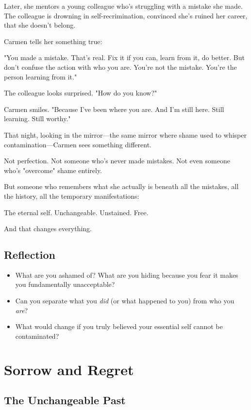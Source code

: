 \documentclass[11pt,twoside]{book}
\begin{document}
Later, she mentors a young colleague who's struggling with a mistake she made. The colleague is drowning in self-recrimination, convinced she's ruined her career, that she doesn't belong.

Carmen tells her something true:

"You made a mistake. That's real. Fix it if you can, learn from it, do better. But don't confuse the action with who you are. You're not the mistake. You're the person learning from it."

The colleague looks surprised. "How do you know?"

Carmen smiles. "Because I've been where you are. And I'm still here. Still learning. Still worthy."

That night, looking in the mirror—the same mirror where shame used to whisper contamination—Carmen sees something different.

Not perfection. Not someone who's never made mistakes. Not even someone who's "overcome" shame entirely.

But someone who remembers what she actually is beneath all the mistakes, all the history, all the temporary manifestations:

The eternal self. Unchangeable. Unstained. Free.

And that changes everything.

\section*{Reflection}

\begin{itemize}
\item What are you ashamed of? What are you hiding because you fear it makes you fundamentally unacceptable?
\item Can you separate what you \emph{did} (or what happened to you) from who you \emph{are}?
\item What would change if you truly believed your essential self cannot be contaminated?
\end{itemize}

\chapter{Sorrow and Regret}

\section*{The Unchangeable Past}
\end{document}
